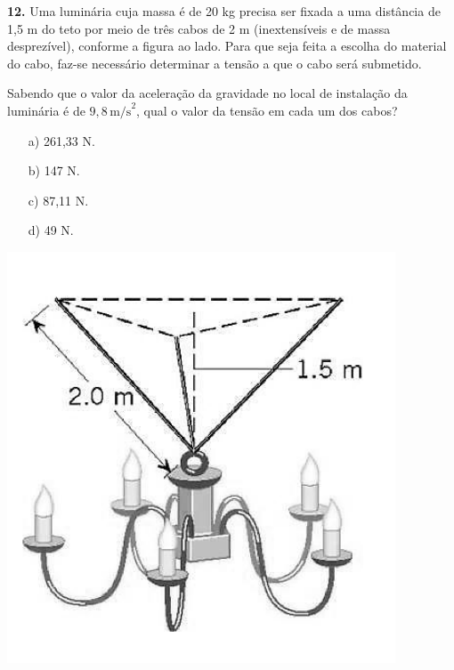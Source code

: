 \documentclass[a4paper,12pt]{article}
\begin{document}
\noindent
\begin{minipage}{0.6\textwidth}
\textbf{12.} Uma luminária cuja massa é de 20 kg precisa ser fixada a uma distância de 1,5 m do teto por meio de três cabos de 2 m (inextensíveis e de massa desprezível), conforme a figura ao lado. Para que seja feita a escolha do material do cabo, faz-se necessário determinar a tensão a que o cabo será submetido.

Sabendo que o valor da aceleração da gravidade no local de instalação da luminária é de \(9,8 \, \mathrm{m/s}^2\), qual o valor da tensão em cada um dos cabos?

\begin{itemize}
    \item[a)] 261,33 N.
    \item[b)] 147 N.
    \item[c)] 87,11 N.
    \item[d)] 49 N.
\end{itemize}
\end{minipage}
\hfill
\begin{minipage}{0.35\textwidth}
\centering
\includegraphics[width=\linewidth]{images/luminaria.png} %
\end{minipage}
\end{document}
